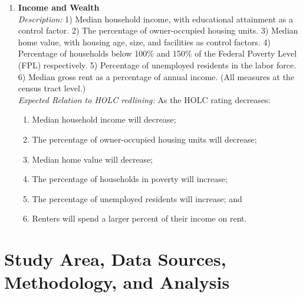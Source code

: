 \documentclass[paper=letter, fontsize=12pt]{scrartcl} %
\begin{document}
\begin{enumerate}
		\item \textbf{Income and Wealth}\\
		\textit{Description:} 1) Median household income, with educational attainment as a control factor. 2) The percentage of owner-occupied housing units. 3) Median home value, with housing age, size, and facilities as control factors. 4) Percentage of households below 100\% and 150\% of the Federal Poverty Level (FPL) respectively. 5) Percentage of unemployed residents in the labor force. 6) Median gross rent as a percentage of annual income. (All measures at the census tract level.)\\
		\textit{Expected Relation to HOLC redlining:} As the HOLC rating decreases:
		\begin{enumerate}
			\item Median household income will decrease;
			\item The percentage of owner-occupied housing units will decrease;
			\item Median home value will decrease;
			\item The percentage of households in poverty will increase;
			\item The percentage of unemployed residents will increase; and
			\item Renters will spend a larger percent of their income on rent.
		\end{enumerate}
	\end{enumerate}
	
	\section{Study Area, Data Sources, Methodology, and Analysis}
\end{document}
